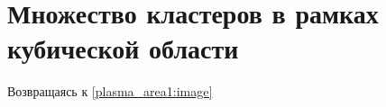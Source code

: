 \section{Множество кластеров в рамках кубической области}

Возвращаясь к \autoref{plasma_area1:image}